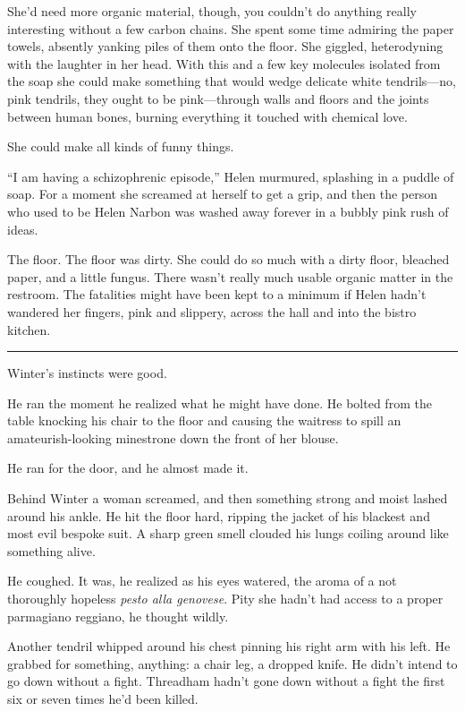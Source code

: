 \documentclass[ebook,10pt]{memoir}
\begin{document}
She'd need more organic material, though, you couldn't do anything
really interesting without a few carbon chains. She spent some time
admiring the paper towels, absently yanking piles of them onto the
floor. She giggled, heterodyning with the laughter in her head. With
this and a few key molecules isolated from the soap she could make
something that would wedge delicate white tendrils---no, pink
tendrils, they ought to be pink---through walls and floors and the
joints between human bones, burning everything it touched with
chemical love.

She could make all kinds of funny things.

``I am having a schizophrenic episode,'' Helen murmured, splashing in
a puddle of soap. For a moment she screamed at herself to get a grip,
and then the person who used to be Helen Narbon was washed away
forever in a bubbly pink rush of ideas.

The floor. The floor was dirty. She could do so much with a dirty
floor, bleached paper, and a little fungus. There wasn't really much
usable organic matter in the restroom. The fatalities might have been
kept to a minimum if Helen hadn't wandered her fingers, pink and
slippery, across the hall and into the bistro kitchen.

\pfbreak

Winter's instincts were good.

He ran the moment he realized what he might have done. He bolted from
the table knocking his chair to the floor and causing the waitress to
spill an amateurish-looking minestrone down the front of her blouse.

He ran for the door, and he almost made it.

Behind Winter a woman screamed, and then something strong and moist
lashed around his ankle. He hit the floor hard, ripping the jacket of
his blackest and most evil bespoke suit. A sharp green smell clouded
his lungs coiling around like something alive.

He coughed. It was, he realized as his eyes watered, the aroma of a
not thoroughly hopeless \emph{pesto alla genovese}. Pity she hadn't
had access to a proper parmagiano reggiano, he thought wildly.

Another tendril whipped around his chest pinning his right arm with
his left. He grabbed for something, anything: a chair leg, a dropped
knife. He didn't intend to go down without a fight. Threadham hadn't
gone down without a fight the first six or seven times he'd been
killed.
\end{document}
